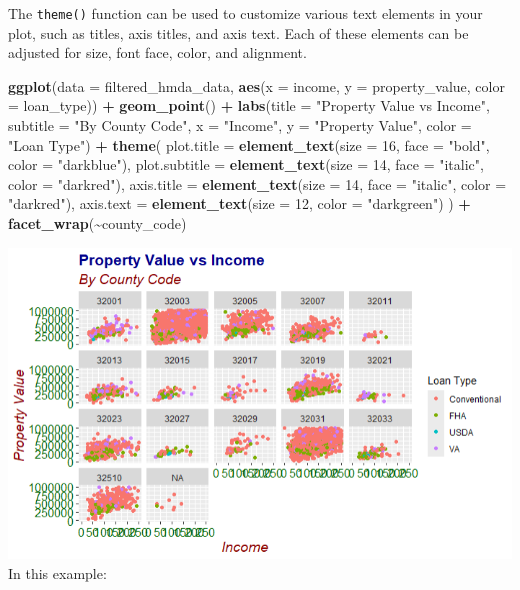 \documentclass[
]{book}
\newenvironment{Shaded}{\begin{snugshade}}{\end{snugshade}}
\newcommand{\AttributeTok}[1]{\textcolor[rgb]{0.13,0.29,0.53}{#1}}
\newcommand{\DecValTok}[1]{\textcolor[rgb]{0.00,0.00,0.81}{#1}}
\newcommand{\FunctionTok}[1]{\textcolor[rgb]{0.13,0.29,0.53}{\textbf{#1}}}
\newcommand{\NormalTok}[1]{#1}
\newcommand{\SpecialCharTok}[1]{\textcolor[rgb]{0.81,0.36,0.00}{\textbf{#1}}}
\newcommand{\StringTok}[1]{\textcolor[rgb]{0.31,0.60,0.02}{#1}}
\begin{document}
The \texttt{theme()} function can be used to customize various text elements in your plot, such as titles, axis titles, and axis text. Each of these elements can be adjusted for size, font face, color, and alignment.

\begin{Shaded}
\begin{Highlighting}[]
\FunctionTok{ggplot}\NormalTok{(}\AttributeTok{data =}\NormalTok{ filtered\_hmda\_data, }\FunctionTok{aes}\NormalTok{(}\AttributeTok{x =}\NormalTok{ income, }\AttributeTok{y =}\NormalTok{ property\_value, }\AttributeTok{color =}\NormalTok{ loan\_type)) }\SpecialCharTok{+}
  \FunctionTok{geom\_point}\NormalTok{() }\SpecialCharTok{+}
  \FunctionTok{labs}\NormalTok{(}\AttributeTok{title =} \StringTok{"Property Value vs Income"}\NormalTok{,}
       \AttributeTok{subtitle =} \StringTok{"By County Code"}\NormalTok{,}
       \AttributeTok{x =} \StringTok{"Income"}\NormalTok{,}
       \AttributeTok{y =} \StringTok{"Property Value"}\NormalTok{,}
       \AttributeTok{color =} \StringTok{"Loan Type"}\NormalTok{) }\SpecialCharTok{+}
  \FunctionTok{theme}\NormalTok{(}
    \AttributeTok{plot.title =} \FunctionTok{element\_text}\NormalTok{(}\AttributeTok{size =} \DecValTok{16}\NormalTok{, }\AttributeTok{face =} \StringTok{"bold"}\NormalTok{, }\AttributeTok{color =} \StringTok{"darkblue"}\NormalTok{),}
    \AttributeTok{plot.subtitle =} \FunctionTok{element\_text}\NormalTok{(}\AttributeTok{size =} \DecValTok{14}\NormalTok{, }\AttributeTok{face =} \StringTok{"italic"}\NormalTok{, }\AttributeTok{color =} \StringTok{"darkred"}\NormalTok{),}
    \AttributeTok{axis.title =} \FunctionTok{element\_text}\NormalTok{(}\AttributeTok{size =} \DecValTok{14}\NormalTok{, }\AttributeTok{face =} \StringTok{"italic"}\NormalTok{, }\AttributeTok{color =} \StringTok{"darkred"}\NormalTok{),}
    \AttributeTok{axis.text =} \FunctionTok{element\_text}\NormalTok{(}\AttributeTok{size =} \DecValTok{12}\NormalTok{, }\AttributeTok{color =} \StringTok{"darkgreen"}\NormalTok{)}
\NormalTok{  ) }\SpecialCharTok{+}
  \FunctionTok{facet\_wrap}\NormalTok{(}\SpecialCharTok{\textasciitilde{}}\NormalTok{county\_code)}
\end{Highlighting}
\end{Shaded}

\includegraphics{images/custom_theme_1.PNG}In this example:
\end{document}
